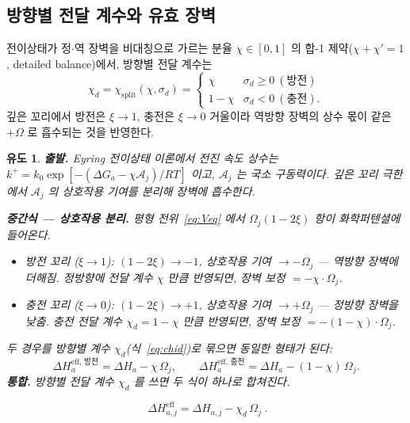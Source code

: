 \documentclass[11pt,a4paper]{article}
\newtheorem*{derivebox}{유도}
\newcommand{\eff}{\mathrm{eff}}
\begin{document}
\subsection{방향별 전달 계수와 유효 장벽}
전이상태가 정$\cdot$역 장벽을 비대칭으로 가르는 분율 $\chi\in[0,1]$ 의 합-1 제약($\chi+\chi'=1$,
detailed balance)에서, 방향별 전달 계수는
\begin{equation}
\chi_d=\chi_\mathrm{split}(\chi,\sigma_d)=
\begin{cases}\chi & \sigma_d\ge0\ (\text{방전})\\ 1-\chi & \sigma_d<0\ (\text{충전}).\end{cases}
\label{eq:chid}
\end{equation}
깊은 꼬리에서 방전은 $\xi\to1$, 충전은 $\xi\to0$ 거울이라 역방향 장벽의 상수 몫이 같은 $+\Omega$ 로 흡수되는 것을 반영한다.

\begin{derivebox}
\textbf{출발.} Eyring 전이상태 이론에서 전진 속도 상수는 $k^+=k_0\exp[-(\Delta G_a-\chi\mathcal{A}_j)/RT]$ 이고,
$\mathcal{A}_j$ 는 국소 구동력이다. 깊은 꼬리 극한에서 $\mathcal{A}_j$ 의 상호작용 기여를 분리해 장벽에 흡수한다.

\textbf{중간식 — 상호작용 분리.}
평형 전위~\eqref{eq:Veq} 에서 $\Omega_j(1-2\xi)$ 항이 화학퍼텐셜에 들어온다.
\begin{itemize}
  \item \emph{방전 꼬리} ($\xi\to1$): $(1-2\xi)\to-1$, 상호작용 기여 $\to-\Omega_j$ — 역방향 장벽에 더해짐.
        정방향에 전달 계수 $\chi$ 만큼 반영되면, 장벽 보정 $=-\chi\cdot\Omega_j$.
  \item \emph{충전 꼬리} ($\xi\to0$): $(1-2\xi)\to+1$, 상호작용 기여 $\to+\Omega_j$ — 정방향 장벽을 낮춤.
        충전 전달 계수 $\chi_d=1-\chi$ 만큼 반영되면, 장벽 보정 $=-(1-\chi)\cdot\Omega_j$.
\end{itemize}
두 경우를 방향별 계수 $\chi_d$(식~\eqref{eq:chid})로 묶으면 동일한 형태가 된다:
\begin{equation*}
  \Delta H_a^{\eff,\,\text{방전}} = \Delta H_a - \chi\,\Omega_j,\qquad
  \Delta H_a^{\eff,\,\text{충전}} = \Delta H_a - (1-\chi)\,\Omega_j.
\end{equation*}
\textbf{통합.} 방향별 전달 계수 $\chi_d$ 를 쓰면 두 식이 하나로 합쳐진다.
\end{derivebox}

\begin{equation}
\boxed{\;\Delta H_{a,j}^\eff=\Delta H_{a,j}-\chi_d\,\Omega_j\;.}
\label{eq:dHeff}
\end{equation}
\end{document}
